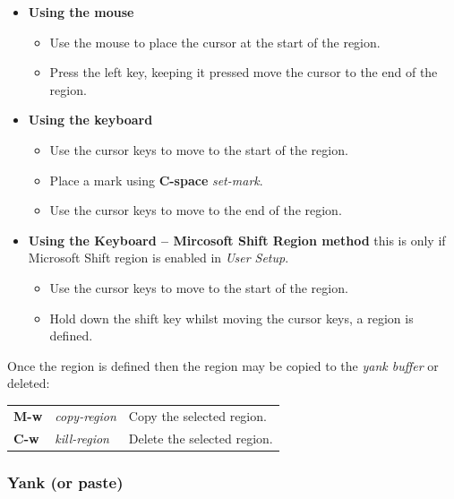 \documentclass[11pt,a4paper,pdftex]{article}
\begin{document}
  \begin{itemize}

    \item \textbf{Using the mouse}
    \begin{itemize}
      \item Use the mouse to place the cursor at the start of the region.
      \item Press the left key, keeping it pressed move the cursor to the end
      of the region.
    \end{itemize}

    \item \textbf{Using the keyboard}
    \begin{itemize}
      \item Use the cursor keys to move to the start of the region.
      \item Place a mark using \textbf{C-space} \textit{set-mark}.
      \item Use the cursor keys to move to the end of the region.
    \end{itemize}

    \item \textbf{Using the Keyboard -- Mircosoft Shift Region method} this is
    only if Microsoft Shift region is enabled in \textit{User Setup}.

    \begin{itemize}
      \item Use the cursor keys to move to the start of the region.
      \item Hold down the shift key whilst moving the cursor keys, a region
      is defined.
    \end{itemize}
  \end{itemize}

  Once the region is defined then the region may be copied to the \textit{yank
  buffer} or deleted:

  \begin{longtable}{ll@{\ --\ }l}
    \endhead
    \endfoot
    \endlastfoot
    \textbf{M-w} & \textit{copy-region} &
    Copy the selected region.\\
    \textbf{C-w} & \textit{kill-region} &
    Delete the selected region.\\
  \end{longtable}

\subsubsection{Yank (or paste)}
\end{document}
